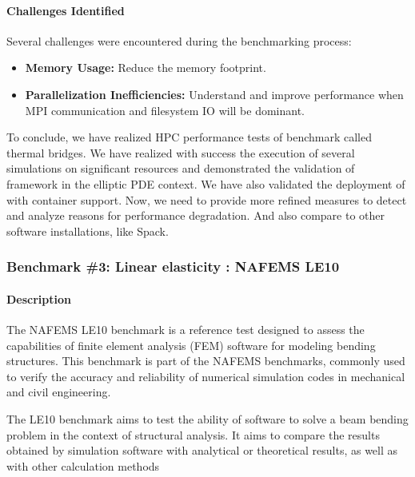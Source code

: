 {}







\paragraph{Challenges Identified}
Several challenges were encountered during the benchmarking process:
\begin{itemize}
    \item \textbf{Memory Usage:} Reduce the memory
      footprint.
    \item \textbf{Parallelization Inefficiencies:} Understand and
      improve performance when MPI communication and filesystem IO will be dominant.
\end{itemize}

To conclude, we have realized HPC performance tests of benchmark called thermal
bridges. We have realized with success the execution of several simulations on
significant resources and demonstrated the validation of \Feelpp framework in the
elliptic PDE context. We have also validated the deployment of \Feelpp with
container support. Now, we need to provide more refined measures to detect and
analyze reasons for performance degradation. And also compare to other software
installations, like Spack.




\subsubsection{Benchmark \#3: Linear elasticity : NAFEMS LE10}
\label{sec:WP1:Feelpp:benchmark:nafems-le10}

\paragraph{Description}
The NAFEMS LE10 benchmark is a reference test designed to assess the
capabilities of finite element analysis (FEM) software for modeling bending
structures. This benchmark is part of the NAFEMS benchmarks, commonly used to
verify the accuracy and reliability of numerical simulation codes in mechanical
and civil engineering.

The LE10 benchmark aims to test the ability of software to solve a beam bending
problem in the context of structural analysis. It aims to compare the results
obtained by simulation software with analytical or theoretical results, as well
as with other calculation methods

